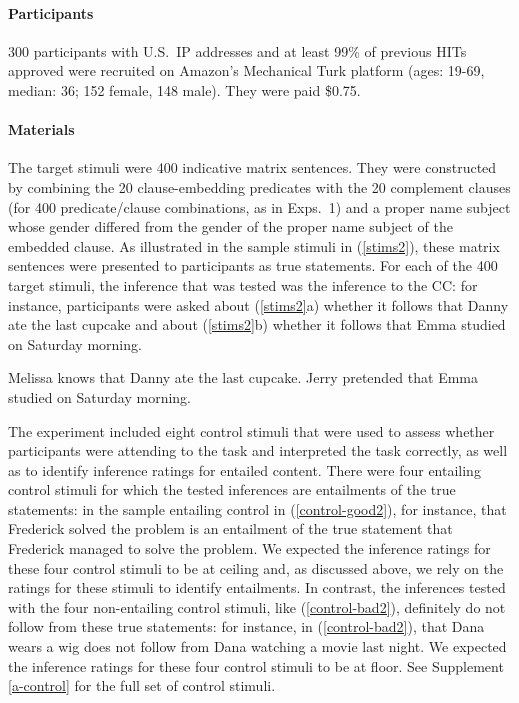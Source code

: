 \documentclass[11pt,fleqn]{article}
\newcommand{\6}{\mbox{$[\hspace*{-.6mm}[$}}
\newcommand{\9}{\mbox{$]\hspace*{-.6mm}]$}}
\begin{document}
\paragraph{Participants} 300 participants with U.S.\ IP addresses and at least 99\% of previous HITs approved were recruited on Amazon's Mechanical Turk platform (ages: 19-69, median: 36; 152 female, 148 male). They were paid \$0.75.

\paragraph{Materials} The target stimuli were 400 indicative matrix sentences. They were constructed by combining the 20 clause-embedding predicates with the 20 complement clauses (for 400 predicate/clause combinations, as in Exps.~1) and a proper name subject whose gender differed from the gender of the proper name subject of the embedded clause. As illustrated in the sample stimuli in (\ref{stims2}), these matrix sentences were presented to participants as true statements. For each of the 400 target stimuli, the inference that was tested was the inference to the CC: for instance, participants were asked about (\ref{stims2}a) whether it follows that Danny ate the last cupcake and about (\ref{stims2}b) whether it follows that Emma studied on Saturday morning.

\begin{exe}
\ex\label{stims2}
\begin{xlist}
 Melissa knows that Danny ate the last cupcake.
 Jerry pretended that Emma studied on Saturday morning.
\end{xlist}
\end{exe}

The experiment included eight control stimuli that were used to assess whether participants were attending to the task and interpreted the task correctly, as well as to identify inference ratings for entailed content. There were four entailing control stimuli for which the tested inferences are entailments of the true statements: in the sample entailing control in (\ref{control-good2}), for instance, that Frederick solved the problem is an entailment of the true statement that Frederick managed to solve the problem. We expected the inference ratings for these four control stimuli to be at ceiling and, as discussed above, we rely on the ratings for these stimuli to identify entailments. In contrast, the inferences tested with the four non-entailing control stimuli, like (\ref{control-bad2}), definitely do not follow from these true statements: for instance, in (\ref{control-bad2}), that Dana wears a wig does not follow from Dana watching a movie last night. We expected the inference ratings for these four control stimuli to be at floor. See Supplement \ref{a-control} for the full set of control stimuli.
\end{document}
